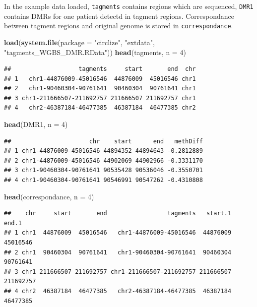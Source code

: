 \documentclass[]{book}
\newenvironment{Shaded}{\begin{snugshade}}{\end{snugshade}}
\newcommand{\KeywordTok}[1]{\textcolor[rgb]{0.13,0.29,0.53}{\textbf{#1}}}
\newcommand{\DataTypeTok}[1]{\textcolor[rgb]{0.13,0.29,0.53}{#1}}
\newcommand{\DecValTok}[1]{\textcolor[rgb]{0.00,0.00,0.81}{#1}}
\newcommand{\StringTok}[1]{\textcolor[rgb]{0.31,0.60,0.02}{#1}}
\newcommand{\NormalTok}[1]{#1}
\theoremstyle{definition}
\theoremstyle{definition}
\theoremstyle{remark}
\begin{document}
In the example data loaded, \texttt{tagments} contains regions which are
sequenced, \texttt{DMR1} contains DMRs for one patient detectd in
tagment regions. Correspondance between tagment regions and original
genome is stored in \texttt{correspondance}.

\begin{Shaded}
\begin{Highlighting}[]
\KeywordTok{load}\NormalTok{(}\KeywordTok{system.file}\NormalTok{(}\DataTypeTok{package =} \StringTok{"circlize"}\NormalTok{, }\StringTok{"extdata"}\NormalTok{, }\StringTok{"tagments_WGBS_DMR.RData"}\NormalTok{))}
\KeywordTok{head}\NormalTok{(tagments, }\DataTypeTok{n =} \DecValTok{4}\NormalTok{)}
\end{Highlighting}
\end{Shaded}

\begin{verbatim}
##                   tagments     start       end  chr
## 1   chr1-44876009-45016546  44876009  45016546 chr1
## 2   chr1-90460304-90761641  90460304  90761641 chr1
## 3 chr1-211666507-211692757 211666507 211692757 chr1
## 4   chr2-46387184-46477385  46387184  46477385 chr2
\end{verbatim}

\begin{Shaded}
\begin{Highlighting}[]
\KeywordTok{head}\NormalTok{(DMR1, }\DataTypeTok{n =} \DecValTok{4}\NormalTok{)}
\end{Highlighting}
\end{Shaded}

\begin{verbatim}
##                      chr    start      end   methDiff
## 1 chr1-44876009-45016546 44894352 44894643 -0.2812889
## 2 chr1-44876009-45016546 44902069 44902966 -0.3331170
## 3 chr1-90460304-90761641 90535428 90536046 -0.3550701
## 4 chr1-90460304-90761641 90546991 90547262 -0.4310808
\end{verbatim}

\begin{Shaded}
\begin{Highlighting}[]
\KeywordTok{head}\NormalTok{(correspondance, }\DataTypeTok{n =} \DecValTok{4}\NormalTok{)}
\end{Highlighting}
\end{Shaded}

\begin{verbatim}
##    chr     start       end                 tagments   start.1     end.1
## 1 chr1  44876009  45016546   chr1-44876009-45016546  44876009  45016546
## 2 chr1  90460304  90761641   chr1-90460304-90761641  90460304  90761641
## 3 chr1 211666507 211692757 chr1-211666507-211692757 211666507 211692757
## 4 chr2  46387184  46477385   chr2-46387184-46477385  46387184  46477385
\end{verbatim}
\end{document}
